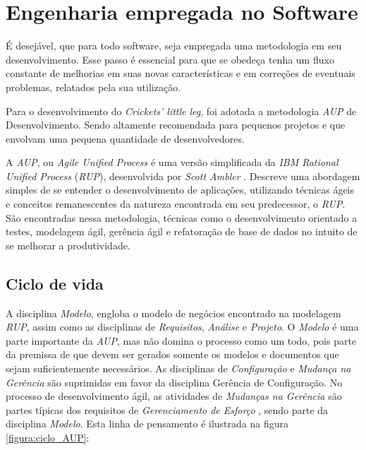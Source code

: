 \chapter{Engenharia empregada no Software}\label{3_engenharia_sw}

É desejável, que para todo software, seja empregada uma metodologia em seu desenvolvimento. Esse passo é essencial para que se obedeça tenha um fluxo constante de melhorias em suas novas características e em correções de eventuais problemas, relatados pela sua utilização.

Para o desenvolvimento do \textit{Crickets' little leg}, foi adotada a metodologia \textit{AUP} de Desenvolvimento. Sendo altamente recomendada para pequenos projetos e que envolvam uma pequena quantidade de desenvolvedores.

A \textit{AUP}, ou \textit{Agile Unified Process} \cite{TheAUP} é uma versão simplificada da \textit{IBM Rational Unified Process} (\textit{RUP}), desenvolvida por \textit{Scott Ambler} . Descreve uma abordagem simples de se entender o desenvolvimento de aplicações, utilizando técnicas ágeis e conceitos remanescentes da natureza encontrada em seu predecessor, o \textit{RUP}. São encontradas nessa metodologia, técnicas como o desenvolvimento orientado a testes, modelagem ágil, gerência ágil e refatoração de base de dados no intuito de se melhorar a produtividade.

\section{Ciclo de vida}

A disciplina \textit{Modelo}, engloba o modelo de negócios encontrado na modelagem \textit{RUP}, assim como as disciplinas de \textit{Requisitos}, \textit{Análise} e \textit{Projeto}. O \textit{Modelo} é uma parte importante da \textit{AUP}, mas não domina o processo como um todo, pois parte da premissa de que devem ser gerados somente os modelos e documentos que sejam suficientemente necessários. As disciplinas de \textit{Configuração} e \textit{Mudança na Gerência} são suprimidas em favor da disciplina Gerência de Configuração. No processo de desenvolvimento ágil, as atividades de \textit{Mudanças na Gerência} são partes típicas dos requisitos de \textit{Gerenciamento de Esforço} \cite{TheAUP}, sendo parte da disciplina \textit{Modelo}. Esta linha de pensamento é ilustrada na figura \ref{figura:ciclo_AUP}:

